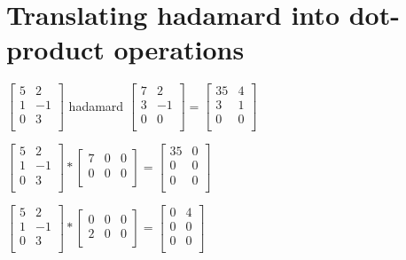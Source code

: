 \documentclass{article}
\begin{document}
\newpage
\section{Translating hadamard into dot-product operations}

$
\begin{bmatrix}
5&2\\
1&-1\\
0&3\\
\end{bmatrix}
$
hadamard 
$
\begin{bmatrix}
7&2\\
3&-1\\
0&0\\
\end{bmatrix}
=
\begin{bmatrix}
35&4\\
3&1\\
0&0\\
\end{bmatrix}
$
\vspace{1cm} 

$
\begin{bmatrix}
5&2\\
1&-1\\
0&3\\
\end{bmatrix}
*
\begin{bmatrix}
7&0&0\\
0&0&0\\
\end{bmatrix}
=
\begin{bmatrix}
35&0\\
0&0\\
0&0\\
\end{bmatrix}
$
\vspace{1cm} 

$
\begin{bmatrix}
5&2\\
1&-1\\
0&3\\
\end{bmatrix}
*
\begin{bmatrix}
0&0&0\\
2&0&0\\
\end{bmatrix}
=
\begin{bmatrix}
0&4\\
0&0\\
0&0\\
\end{bmatrix}
$
\vspace{1cm} 
\end{document}
